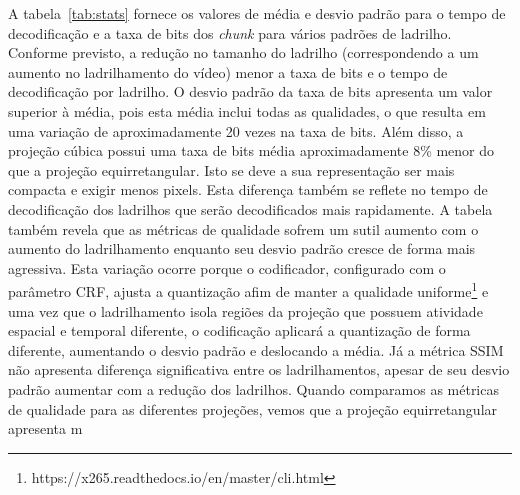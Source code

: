 A tabela~\ref{tab:stats} fornece os valores de média e desvio padrão para o tempo de decodificação e a taxa de bits dos \textit{chunk} para vários padrões de ladrilho. Conforme previsto, a redução no tamanho do ladrilho (correspondendo a um aumento no ladrilhamento do vídeo) menor a taxa de bits e o tempo de decodificação por ladrilho. O desvio padrão da taxa de bits apresenta um valor superior à média, pois esta média inclui todas as qualidades, o que resulta em uma variação de aproximadamente 20 vezes na taxa de bits. Além disso, a projeção cúbica possui uma taxa de bits média aproximadamente 8\% menor do que a projeção equirretangular. Isto se deve a sua representação ser mais compacta e exigir menos pixels. Esta diferença também se reflete no tempo de decodificação dos ladrilhos que serão decodificados mais rapidamente.
A tabela também revela que as métricas de qualidade sofrem um sutil aumento com o aumento do ladrilhamento enquanto seu desvio padrão cresce de forma mais agressiva. Esta variação ocorre porque o codificador, configurado com o parâmetro CRF, ajusta a quantização afim de manter a qualidade uniforme\footnote{https://x265.readthedocs.io/en/master/cli.html} e uma vez que o ladrilhamento isola regiões da projeção que possuem atividade espacial e temporal diferente, o codificação aplicará a quantização de forma diferente, aumentando o desvio padrão e deslocando a média. %
Já a métrica SSIM não apresenta diferença significativa entre os ladrilhamentos, apesar de seu desvio padrão aumentar com a redução dos ladrilhos. Quando comparamos as métricas de qualidade para as diferentes projeções, vemos que a projeção equirretangular apresenta m

